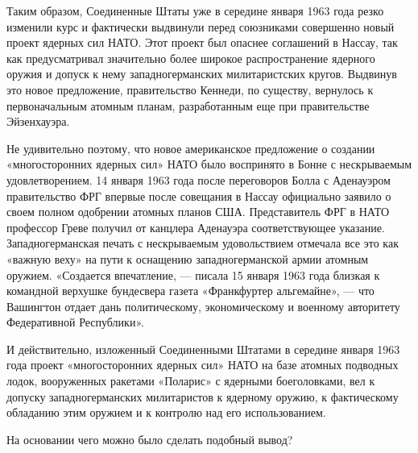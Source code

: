 \documentclass[12pt, a4paper, openany]{book}
\begin{document}
Таким образом, Соединенные Штаты уже в середине января 1963 года резко изменили курс и фактически выдвинули перед союзниками совершенно новый проект ядерных сил НАТО. Этот проект был опаснее соглашений в Нассау, так как предусматривал значительно более широкое  распространение ядерного оружия и допуск к нему западногерманских милитаристских кругов. Выдвинув это новое предложение, правительство Кеннеди, по существу, вернулось к  первоначальным атомным планам, разработанным еще при  правительстве Эйзенхауэра.

Не удивительно поэтому, что новое американское предложение о создании «многосторонних ядерных сил» НАТО было воспринято в Бонне с нескрываемым удовлетворением. 14 января 1963 года после переговоров Болла с Аденауэром правительство ФРГ впервые после совещания в Нассау  официально заявило о своем полном одобрении атомных планов США. Представитель ФРГ в НАТО профессор Греве получил от канцлера Аденауэра соответствующее указание.  Западногерманская печать с нескрываемым удовольствием отмечала все это как «важную веху» на пути к оснащению  западногерманской армии атомным оружием. «Создается  впечатление, — писала 15 января 1963 года близкая к командной  верхушке бундесвера газета «Франкфуртер альгемайне», — что Вашингтон отдает дань политическому, экономическому и  военному авторитету Федеративной Республики».

И действительно, изложенный Соединенными Штатами в середине января 1963 года проект «многосторонних ядерных сил» НАТО на базе атомных подводных лодок, вооруженных ракетами «Поларис» с ядерными боеголовками, вел к  допуску западногерманских милитаристов к ядерному оружию, к фактическому обладанию этим оружием и к контролю над его использованием.

На основании чего можно было сделать подобный вывод?
\end{document}
